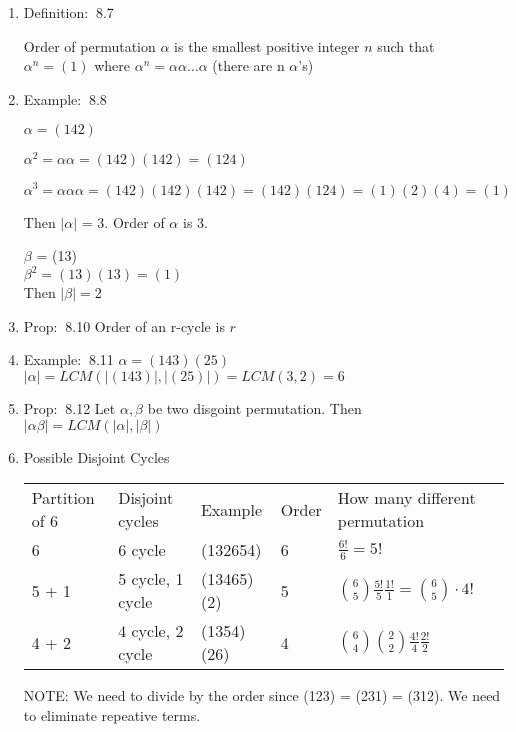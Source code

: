 \documentclass[12pt]{article}
\newcommand{\defi}{{\color{blue} Definition: $\ $}}
\newcommand{\exe}{{\color{green} Example: $\ $}}
\newcommand{\prop}{{\color{blue} Prop: $\ $}}
\begin{document}
\begin{enumerate}
    \item \defi 8.7 
    
    Order of permutation $\alpha$ is the smallest positive integer $n$ such that $\alpha^n = (1)$ where $\alpha^n = \alpha \alpha \dots \alpha$ (there are n $\alpha$'s)

    \item \exe 8.8 

    $\alpha = (142)$

    $\alpha^2 = \alpha \alpha = (142)(142) = (124)$

    $\alpha^3 = \alpha\alpha\alpha = (142)(142)(142) = (142)(124) = (1)(2)(4) = (1)$

    Then $|\alpha|$ = 3. Order of $\alpha$ is 3.

    $\beta$ = (13)\\
    $\beta^2 = (13)(13) = (1)$ \\
    Then $|\beta| = 2$
    
    \item \prop 8.10 Order of an r-cycle is $r$
    
    \item \exe 8.11 $\alpha = (143)(25)$\\
    $|\alpha| = LCM(|(143)|,|(25)|) = LCM(3,2) = 6 $

    \item \prop 8.12 Let $\alpha, \beta$ be two disgoint permutation. Then $|\alpha\beta| = LCM(|\alpha|,|\beta|)$
    
    \item Possible Disjoint Cycles\\
    \begin{tabular}{l|l|l|l|l}
        \hline
        Partition of 6 & Disjoint cycles & Example & Order & How many different permutation \\
        6 & 6 cycle & (132654)& 6 & $\frac{6!}{6} = 5!$ \\
        5 + 1& 5 cycle, 1 cycle & (13465)(2) & 5 & ${6 \choose 5} \frac{5!}{5} \frac{1!}{1} = {6 \choose 5}\cdot 4!$ \\
        4 + 2 & 4 cycle, 2 cycle & (1354)(26) & 4 & ${6 \choose 4}{2 \choose 2} \frac{4!}{4} \frac{2!}{2}$
    \end{tabular}
    NOTE: We need to divide by the order since (123) = (231) = (312). We need to eliminate repeative terms.
\end{enumerate}
\end{document}
